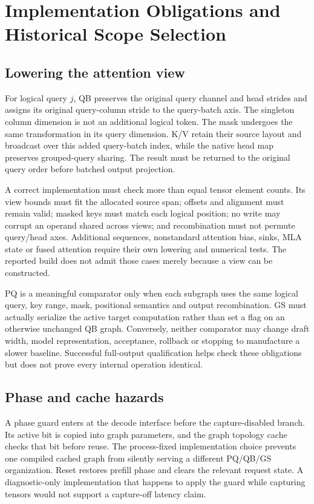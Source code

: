 \section{Implementation Obligations and Historical Scope Selection}
\label{supp:implementation}
\subsection{Lowering the attention view}
For logical query $j$, QB preserves the original query channel and head strides and assigns its original query-column stride to the query-batch axis. The singleton column dimension is not an additional logical token. The mask undergoes the same transformation in its query dimension. K/V retain their source layout and broadcast over this added query-batch index, while the native head map preserves grouped-query sharing. The result must be returned to the original query order before batched output projection.

A correct implementation must check more than equal tensor element counts. Its view bounds must fit the allocated source span; offsets and alignment must remain valid; masked keys must match each logical position; no write may corrupt an operand shared across views; and recombination must not permute query/head axes. Additional sequences, nonstandard attention bias, sinks, MLA state or fused attention require their own lowering and numerical tests. The reported build does not admit those cases merely because a view can be constructed.

PQ is a meaningful comparator only when each subgraph uses the same logical query, key range, mask, positional semantics and output recombination. GS must actually serialize the active target computation rather than set a flag on an otherwise unchanged QB graph. Conversely, neither comparator may change draft width, model representation, acceptance, rollback or stopping to manufacture a slower baseline. Successful full-output qualification helps check these obligations but does not prove every internal operation identical.

\subsection{Phase and cache hazards}
A phase guard enters at the decode interface before the capture-disabled branch. Its active bit is copied into graph parameters, and the graph topology cache checks that bit before reuse. The process-fixed implementation choice prevents one compiled cached graph from silently serving a different PQ/QB/GS organization. Reset restores prefill phase and clears the relevant request state. A diagnostic-only implementation that happens to apply the guard while capturing tensors would not support a capture-off latency claim.

